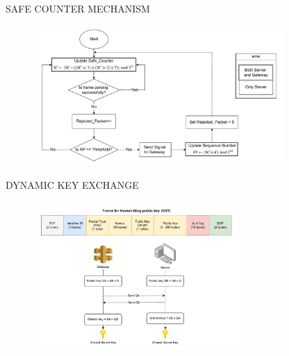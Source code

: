 \begin{frame}{SAFE COUNTER MECHANISM}
\vspace{-0.3cm}
    \begin{figure}
    	\centering
    	\includegraphics[width=0.85\textwidth]{pic/sc.pdf}
    \end{figure}
\end{frame}

\begin{frame}{DYNAMIC KEY EXCHANGE}
    \vspace{-0.3cm}
    \begin{figure}
    	\centering
    	\includegraphics[width=0.7\textwidth]{pic/ecdh.pdf}
    \end{figure}
\end{frame}

